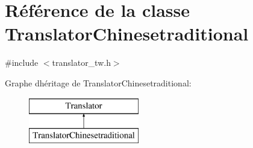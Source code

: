 \hypertarget{class_translator_chinesetraditional}{}\section{Référence de la classe Translator\+Chinesetraditional}
\label{class_translator_chinesetraditional}


{\ttfamily \#include $<$translator\+\_\+tw.\+h$>$}

Graphe d\textquotesingle{}héritage de Translator\+Chinesetraditional\+:\begin{figure}[H]
\begin{center}
\leavevmode
\includegraphics[height=2.000000cm]{class_translator_chinesetraditional}
\end{center}
\end{figure}
